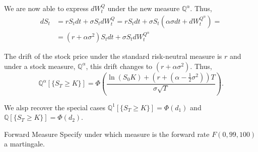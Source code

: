 \documentclass{beamer}
\begin{document}
\begin{frame}{}
We are now able to express $dW^Q_t$ under the new measure $\mathbb{Q}^\alpha$. Thus,
\begin{equation*}
\begin{aligned}
dS_t&=rS_tdt+\sigma S_t dW^Q_t=rS_tdt+\sigma S_t(\alpha\sigma dt+dW^{Q^\alpha}_t)=\\
&=(r+\alpha\sigma^2)S_tdt+\sigma S_tdW^{Q^\alpha}_t
\end{aligned}
\end{equation*}

The drift of the stock price under the standard risk-neutral measure is $r$ and under a stock measure, $\mathbb{Q}^\alpha$, this drift changes to $(r+\alpha\sigma^2)$.
Thus,
\begin{equation*}
\mathbb{Q}^\alpha[\{S_T\ge K\}]=\Phi\left(\frac{\ln(S_0K)+\left(r+\left(\alpha-\frac{1}{2}\sigma^2\right)\right)T}{\sigma\sqrt{T}}\right).
\end{equation*}

We alsp recover the special cases $\mathbb{Q}^1[\{S_T\ge K\}]=\Phi(d_1)$ and $\mathbb{Q}[\{S_T\ge K\}]=\Phi(d_2)$.
\end{frame}



\begin{frame}{}
	\begin{block}{Forward Measure}
		Specify under which measure is the forward rate $F(0,99,100)$ a martingale.
	\end{block}
\end{frame}
\end{document}
